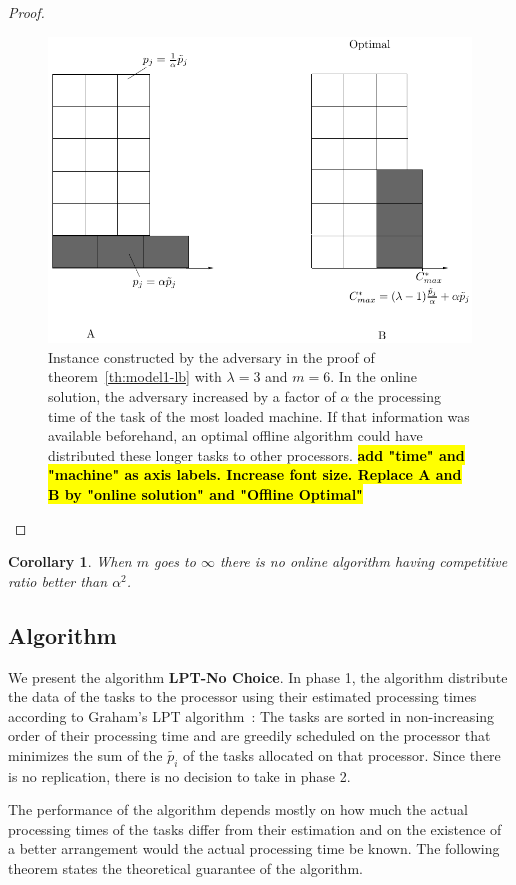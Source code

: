\documentclass[10pt, conference, compsocconf]{IEEEtran}
\newtheorem{corollary}{Corollary}[theorem]
\newcommand{\todo}[1]{{\color{red}\textbf{\hl{#1}}\xspace}}
\begin{document}
\begin{proof}
  \begin{figure}[htp]
  \centering
  \includegraphics[width= 8 cm]{model1.pdf}
  \caption{Instance constructed by the adversary in the proof of
    theorem~\ref{th:model1-lb} with $\lambda = 3$ and $m = 6$. In the
    online solution, the adversary increased by a factor of $\alpha$
    the processing time of the task of the most loaded machine. If
    that information was available beforehand, an optimal offline
    algorithm could have distributed these longer tasks to other
    processors.  \todo{add "time" and "machine" as axis
      labels. Increase font size. Replace A and B by "online solution"
      and "Offline Optimal"}}
  \label{fig:rara}
  \end{figure}
\end{proof}    
  
  
  \begin{corollary}
  When $m$ goes to $\infty$ there is no online algorithm having competitive ratio better than $\alpha^{2}$.
  \end{corollary}
  
\subsection{Algorithm}

We present the algorithm \textbf{LPT-No Choice}. In phase 1, the
algorithm distribute the data of the tasks to the processor using
their estimated processing times according to Graham's LPT
algorithm~\cite{Graham69boundson}: The tasks are sorted in non-increasing
order of their processing time and are greedily scheduled on the
processor that minimizes the sum of the $\tilde{p_i}$ of the tasks
allocated on that processor. Since there is no replication, there is
no decision to take in phase 2.

The performance of the algorithm depends mostly on how much the actual
processing times of the tasks differ from their estimation and on the
existence of a better arrangement would the actual processing time be
known. The following theorem states the theoretical guarantee of the
algorithm.
\end{document}

